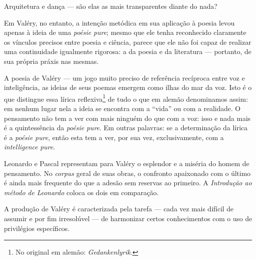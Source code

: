Arquitetura e dança --- são elas as mais transparentes diante do nada?

Em Valéry, no entanto, a intenção metódica em sua aplicação à poesia
levou apenas à ideia de uma \emph{poésie pure}; mesmo que ele tenha
reconhecido claramente os vínculos precisos entre poesia e ciência,
parece que ele não foi capaz de realizar uma continuidade igualmente
rigorosa: a da poesia e da literatura --- portanto, de sua própria práxis
nas mesmas.

A poesia de Valéry --- um jogo muito preciso de referência recíproca entre
voz e inteligência, as ideias de seus poemas emergem como ilhas do mar
da voz. Isto é o que distingue essa lírica reflexiva\footnote{No
  original em alemão: \emph{Gedankenlyrik}. \versal{[N.~T.]}} de tudo o que em alemão denominamos
assim: em nenhum lugar nela a ideia se encontra com a ``vida'' ou com a
realidade. O pensamento não tem a ver com mais ninguém do que com a voz:
isso e nada mais é a quintessência da \emph{poésie pure}. Em outras
palavras: se a determinação da lírica é a \emph{poésie pure}, então esta
tem a ver, por sua vez, exclusivamente, com a \emph{intelligence}
\emph{pure}.

Leonardo e Pascal representam para Valéry o esplendor e a miséria do
homem de pensamento. No \emph{corpus} geral de suas obras, o confronto
apaixonado com o último é ainda mais frequente do que a adesão sem
reservas ao primeiro. A \emph{Introdução ao método de Leonardo} coloca os
dois em comparação.

A produção de Valéry é caracterizada pela tarefa --- cada vez mais
difícil de assumir e por fim irresolúvel --- de harmonizar certos
conhecimentos com o uso de privilégios específicos.

